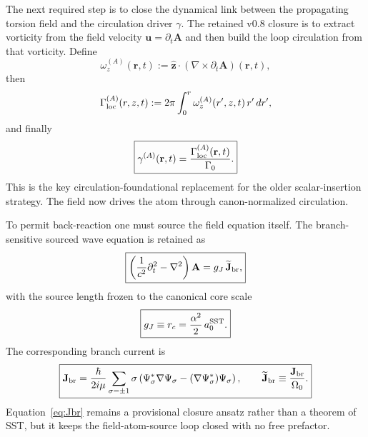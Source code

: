 \documentclass[11pt,a4paper]{article}
\begin{document}
The next required step is to close the dynamical link between the propagating torsion field and the circulation driver $\gamma$. The retained v0.8 closure is to extract vorticity from the field velocity $\mathbf u=\partial_t\mathbf A$ and then build the loop circulation from that vorticity. Define
\begin{equation}
\label{eq:omegaA}
\omega_z^{(A)}(\mathbf r,t)
:=
\hat{\mathbf z}\cdot\left(\nabla\times \partial_t \mathbf A\right)(\mathbf r,t),
\end{equation}
then
\begin{equation}
\label{eq:GammaA}
\Gamma_{\rm loc}^{(A)}(r,z,t)
:=
2\pi\int_0^r \omega_z^{(A)}(r',z,t)\,r'\,dr',
\end{equation}
and finally
\begin{equation}
\label{eq:gammaA}
\boxed{
\gamma^{(A)}(\mathbf r,t)
=
\frac{\Gamma_{\rm loc}^{(A)}(\mathbf r,t)}{\Gamma_0}.
}
\end{equation}
This is the key circulation-foundational replacement for the older scalar-insertion strategy. The field now drives the atom through canon-normalized circulation.

To permit back-reaction one must source the field equation itself. The branch-sensitive sourced wave equation is retained as
\begin{equation}
\label{eq:Awave-source}
\boxed{
\left(\frac{1}{c^2}\partial_t^2-\nabla^2\right)\mathbf A
=
g_J \,\widetilde{\mathbf J}_{\rm br},
}
\end{equation}
with the source length frozen to the canonical core scale
\begin{equation}
\label{eq:gJfreeze}
\boxed{
 g_J \equiv r_c = \frac{\alpha^2}{2}\,a_0^{\rm SST}.
}
\end{equation}
The corresponding branch current is
\begin{equation}
\label{eq:Jbr}
\boxed{
\mathbf J_{\rm br}
=
\frac{\hbar}{2 i \mu}
\sum_{\sigma=\pm 1}
\sigma
\left(
\Psi_\sigma^*\nabla\Psi_\sigma
-
(\nabla\Psi_\sigma^*)\Psi_\sigma
\right),
\qquad
\widetilde{\mathbf J}_{\rm br}\equiv \frac{\mathbf J_{\rm br}}{\Omega_0}.
}
\end{equation}
Equation~\eqref{eq:Jbr} remains a provisional closure ansatz rather than a theorem of SST, but it keeps the field-atom-source loop closed with no free prefactor.
\end{document}
